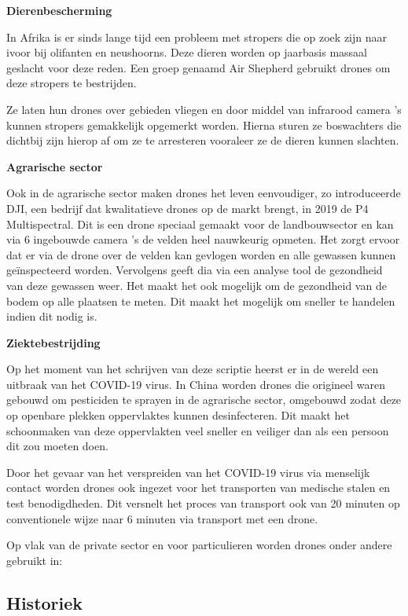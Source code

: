 \textbf{Dierenbescherming}

In Afrika is er sinds lange tijd een probleem met stropers die op zoek zijn naar ivoor bij olifanten en neushoorns. Deze dieren worden op jaarbasis massaal geslacht voor deze reden. Een groep genaamd Air Shepherd gebruikt drones om deze stropers te bestrijden. 

Ze laten hun drones over gebieden vliegen en door middel van infrarood camera 's kunnen stropers gemakkelijk opgemerkt worden. Hierna sturen ze boswachters die dichtbij zijn hierop af om ze te arresteren vooraleer ze de dieren kunnen slachten. \autocite{Fieldstadt2015}

\textbf{Agrarische sector}

Ook in de agrarische sector maken drones het leven eenvoudiger, zo introduceerde DJI, een bedrijf dat kwalitatieve drones op de markt brengt, in 2019 de P4 Multispectral. Dit is een drone speciaal gemaakt voor de landbouwsector en kan via 6 ingebouwde camera 's de velden heel nauwkeurig opmeten. Het zorgt ervoor dat er via de drone over de velden kan gevlogen worden en alle gewassen kunnen geïnspecteerd worden. Vervolgens geeft dia via een analyse tool de gezondheid van deze gewassen weer. Het maakt het ook mogelijk om de gezondheid van de bodem op alle plaatsen te meten. Dit maakt het mogelijk om sneller te handelen indien dit nodig is. \autocite{DJI2019}

\textbf{Ziektebestrijding}

Op het moment van het schrijven van deze scriptie heerst er in de wereld een uitbraak van het COVID-19 virus. In China worden drones die origineel waren gebouwd om pesticiden te sprayen in de agrarische sector, omgebouwd zodat deze op openbare plekken oppervlaktes kunnen desinfecteren. Dit maakt het schoonmaken van deze oppervlakten veel sneller en veiliger dan als een persoon dit zou moeten doen.\autocite{Yuang2020}

Door het gevaar van het verspreiden van het COVID-19 virus via menselijk contact worden drones ook ingezet voor het transporten van medische stalen en test benodigdheden. Dit versnelt het proces van transport ook van 20 minuten op conventionele wijze naar 6 minuten via transport met een drone.\autocite{Yuang2020}

Op vlak van de private sector en voor particulieren worden drones onder andere gebruikt in:

\subsection{Historiek}
\label{sec:Historiek}

